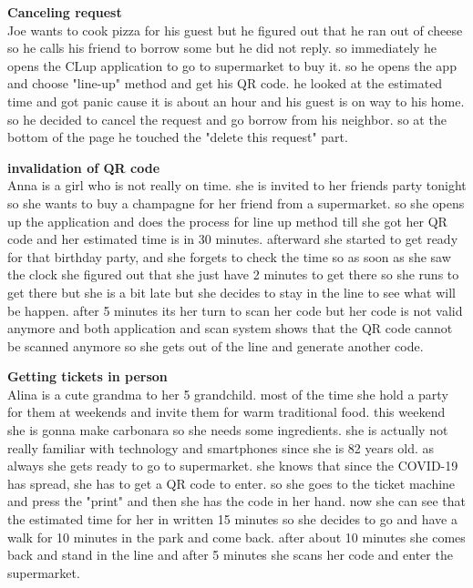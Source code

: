 \begin{SC}[wide]
    \item \textbf{Canceling request} \\
    Joe wants to cook pizza for his guest but he figured out that he ran out of cheese so he calls his friend to borrow some but he did not reply. so immediately he opens the CLup application to go to supermarket to buy it. so he opens the app and choose "line-up" method and get his QR code. he looked at the estimated time and got panic cause it is about an hour and his guest is on way to his home. so he decided to cancel the request and go borrow from his neighbor. so at the bottom of the page he touched the "delete this request" part.\\
    
    \item \textbf{invalidation of QR code} \\
    Anna is a girl who is not really on time. she is invited to her friends party tonight so she wants to buy a champagne for her friend from a supermarket. so she opens up the application and does the process for line up method till she got her QR code and her estimated time is in 30 minutes. afterward she started to get ready for that birthday party, and she forgets to check the time so as soon as she saw the clock she figured out that she just have 2 minutes to get there so she runs to get there but she is a bit late but she decides to stay in the line to see what will be happen. after 5 minutes its her turn to scan her code but her code is not valid anymore and both application and scan system shows that the QR code cannot be scanned anymore so she gets out of the line and generate another code.\\
    
    \item \textbf{Getting tickets in person} \\
    Alina is a cute grandma to her 5 grandchild. most of the time she hold a party for them at weekends and invite them for warm traditional food. this weekend she is gonna make carbonara so she needs some ingredients. she is actually not really familiar with technology and smartphones since she is 82 years old. as always she gets ready to go to supermarket. she knows that since the COVID-19 has spread, she has to get a QR code to enter. so she goes to the ticket machine and press the "print" and then she has the code in her hand. now she can see that the estimated time for her in written 15 minutes so she decides to go and have a walk for 10 minutes in the park and come back. after about 10 minutes she comes back and stand in the line and after 5 minutes she scans her code and enter the supermarket.\\
    

\end{SC}
